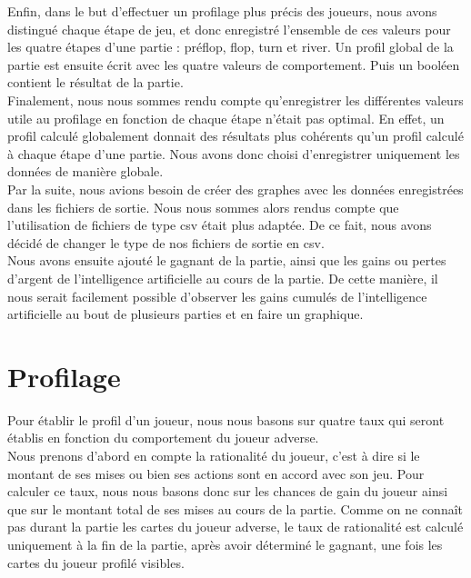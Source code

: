 \documentclass{report}
\begin{document}
Enfin, dans le but d'effectuer un profilage plus précis des joueurs, nous avons distingué chaque étape de jeu, et donc enregistré l'ensemble de ces valeurs pour les quatre étapes d'une partie : préflop, flop, turn et river. Un profil global de la partie est ensuite écrit avec les quatre valeurs de comportement. Puis un booléen contient le résultat de la partie.\\

Finalement, nous nous sommes rendu compte qu'enregistrer les différentes valeurs utile au profilage en fonction de chaque étape n'était pas optimal. En effet, un profil calculé globalement donnait des résultats plus cohérents qu'un profil calculé à chaque étape d'une partie. Nous avons donc choisi d'enregistrer uniquement les données de manière globale.\\


Par la suite, nous avions besoin de créer des graphes avec les données enregistrées dans les fichiers de sortie. Nous nous sommes alors rendus compte que l'utilisation de fichiers de type csv était plus adaptée. De ce fait, nous avons décidé de changer le type de nos fichiers de sortie en csv.\\

Nous avons ensuite ajouté le gagnant de la partie, ainsi que les gains ou pertes d'argent de l'intelligence artificielle au cours de la partie. De cette manière, il nous serait facilement possible d'observer les gains cumulés de l'intelligence artificielle au bout de plusieurs parties et en faire un graphique.\par


\section{Profilage}
\hspace{0.5cm}Pour établir le profil d'un joueur, nous nous basons sur quatre taux qui seront établis en fonction du comportement du joueur adverse.\\

Nous prenons d'abord en compte la rationalité du joueur, c'est à dire si le montant de ses mises ou bien ses actions sont en accord avec son jeu. Pour calculer ce taux, nous nous basons donc sur les chances de gain du joueur ainsi que sur le montant total de ses mises au cours de la partie. Comme on ne connaît pas durant la partie les cartes du joueur adverse, le taux de rationalité est calculé uniquement à la fin de la partie, après avoir déterminé le gagnant, une fois les cartes du joueur profilé visibles.\\
\end{document}
